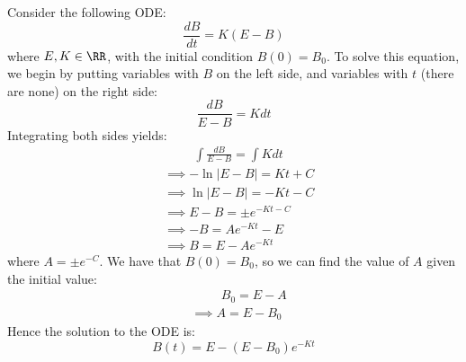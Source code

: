 \begin{example}
    Consider the following ODE:
    \[\frac{dB}{dt} = K(E - B)\]
    where $E, K \in \RR$, with the initial condition $B(0) = B_0$. To solve this equation, we begin by putting variables with $B$ on the left side, and variables with $t$ (there are none) on the right side:
    \[\frac{dB}{E - B} = K dt\]
    Integrating both sides yields:
    \begin{align*}
        &\hspace{1cm} \int \frac{dB}{E - B} = \int K dt \\
        &\implies -\ln|E - B| = Kt + C \\
        &\implies \ln|E - B| = -Kt - C \\
        &\implies E - B = \pm e^{-Kt - C} \\
        &\implies -B = Ae^{-Kt} - E \\
        &\implies B = E - Ae^{-Kt} 
    \end{align*}
    where $A = \pm e^{-C}$. We have that $B(0) = B_0$, so we can find the value of $A$ given the initial value:
    \begin{align*}
        &\hspace{1cm} B_0 = E - A \\
        &\implies A = E - B_0
    \end{align*}
    Hence the solution to the ODE is:
    \[B(t) = E - (E - B_0)e^{-Kt}\]
\end{example} 

